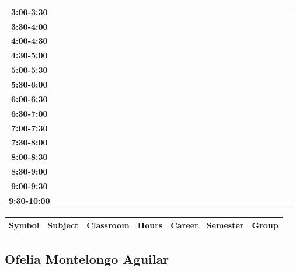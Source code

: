 \documentclass{article}
\begin{document}
\begin{table}[ht]
\begin{tabular}{|c|c|c|c|c|c|c|c|c|c|c|c|c|c|c|c|c|c|c|c|c|c|c|c|c|c|c|c|c|c|}
 \cline{1-8} 
\textbf{3:00-3:30} &   &   &   &   &   &   &   \\
 \cline{1-8} 
\textbf{3:30-4:00} &   &   &   &   &   &   &   \\
 \cline{1-8} 
\textbf{4:00-4:30} &   &   &   &   &   &   &   \\
 \cline{1-8} 
\textbf{4:30-5:00} &   &   &   &   &   &   &   \\
 \cline{1-8} 
\textbf{5:00-5:30} &   &   &   &   &   &   &   \\
 \cline{1-8} 
\textbf{5:30-6:00} &   &   &   &   &   &   &   \\
 \cline{1-8} 
\textbf{6:00-6:30} &   &   &   &   &   &   &   \\
 \cline{1-8} 
\textbf{6:30-7:00} &   &   &   &   &   &   &   \\
 \cline{1-8} 
\textbf{7:00-7:30} &   &   &   &   &   &   &   \\
 \cline{1-8} 
\textbf{7:30-8:00} &   &   &   &   &   &   &   \\
 \cline{1-8} 
\textbf{8:00-8:30} &   &   &   &   &   &   &   \\
 \cline{1-8} 
\textbf{8:30-9:00} &   &   &   &   &   &   &   \\
 \cline{1-8} 
\textbf{9:00-9:30} &   &   &   &   &   &   &   \\
 \cline{1-8} 
\textbf{9:30-10:00} &   &   &   &   &   &   &   \\
 \cline{1-8} 
\end{tabular}\end{table}

        
        \begin{tabular}{|>{\centering\arraybackslash}m{2cm}|>{\centering\arraybackslash}m{4cm}|>{\centering\arraybackslash}m{2cm}|>{\centering\arraybackslash}m{2cm}|>{\centering\arraybackslash}m{2cm}|>{\centering\arraybackslash}m{2cm}|>{\centering\arraybackslash}m{2cm}|}
        \hline
        \textbf{Symbol} & \textbf{Subject} & \textbf{Classroom} & \textbf{Hours} & \textbf{Career} & \textbf{Semester} & \textbf{Group} \\
        \hline
        \end{tabular}
                    

        \newpage
        

        \subsection{Ofelia Montelongo Aguilar}
        \vspace*{.1cm}
        
\end{document}
